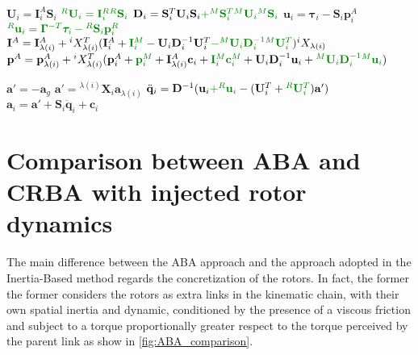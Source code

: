 \begin{algorithm}
\begin{algorithmic}[1]
        \STATE $\mathbf{U}_i = \mathbf{I}_i ^A \mathbf{S}_i$
        \STATE $\color{webgreen}{{}^R\mathbf{U}_i = \mathbf{I}_i ^R {}^R\mathbf{S}_i}$
        \STATE $\mathbf{D} _i = \mathbf{S} ^T _i  {} \mathbf{U} _i \mathbf{S} _i \textcolor{webgreen}{+ {} ^M\mathbf{S} ^T _i  {} ^M\mathbf{U} _i {} ^M\mathbf{S} _i}$
        \STATE $\mathbf{u}_i = \boldsymbol{\tau}_i - \mathbf{S}_i\mathbf{p}_i^A$
        \STATE $\color{webgreen}{{}^R\mathbf{u}_i = \boldsymbol{\Gamma}^{-T}\boldsymbol{\tau}_i - {}^R\mathbf{S}_i\mathbf{p}_i^R}$
        \STATE $\mathbf{I} ^A = \mathbf{I} ^A _{\lambda (i)} + {} ^i X _{\lambda (i)} ^T (\mathbf{I} _i ^A + \textcolor{webgreen}{\mathbf{I} _i ^M } - {}  \mathbf{U} _i  \mathbf{D} ^{-1} _i  {}  \mathbf{U} ^T _i \textcolor{webgreen}{- {} ^M \mathbf{U} _i  \mathbf{D} ^{-1} _i {} ^M \mathbf{U} ^T _i}) {} ^i X _{\lambda (i)} $
        \STATE $\mathbf{p} ^A = \mathbf{p} ^A _{\lambda (i)} + {} ^i X _{\lambda (i)} ^T (\mathbf{p} ^A_i + \textcolor{webgreen}{\mathbf{p} ^M_i } + \mathbf{I} ^A _{\lambda (i)}  \mathbf{c}_i + \textcolor{webgreen}{\mathbf{I} {} ^M _i \mathbf{c} ^M _i }+ {}  \mathbf{U} _i \mathbf{D} ^{-1} _i {} \mathbf{u} _i + \textcolor{webgreen}{{} ^M \mathbf{U} _i \mathbf{D} ^{-1} _i {} ^M\mathbf{u} _i}) $
        \ENDIF
        \ENDFOR

        \STATE $\mathbf{a}' = -\mathbf{a}_g$
        \ELSE
        \STATE $\mathbf{a}' = {}^{\lambda(i)}\mathbf{X}_i \mathbf{a}_{\lambda(i)}$
        \STATE $\ddot{\mathbf{q}}_i = \mathbf{D}^{-1} (\mathbf{u}_i \textcolor{webgreen}{+ {}^R\mathbf{u}_i }- (\mathbf{U}_i^T + \textcolor{webgreen}{{}^R\mathbf{U}_i^T})\mathbf{a}')$
        \STATE $\mathbf{a}_i = \mathbf{a}' + \mathbf{S}_i\mathbf{\ddot{q}}_i + \mathbf{c} _i$
        \ENDIF
        \ENDFOR
    \end{algorithmic}
\end{algorithm}



\section{Comparison between ABA and CRBA with injected rotor dynamics}

The main difference between the \ac{ABA} approach and the approach adopted in the Inertia-Based method regards the concretization of the rotors. In fact, the former the former considers the rotors as extra links in the kinematic chain, with their own spatial inertia and dynamic, conditioned by the presence of a viscous friction and subject to a torque proportionally greater respect to the torque perceived by the parent link as show in \cref{fig:ABA_comparison}.

